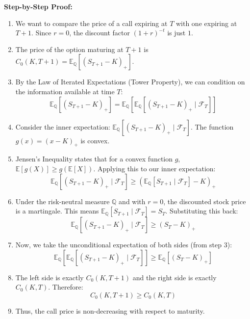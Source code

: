 \textbf{Step-by-Step Proof:}
\begin{enumerate}
    \item We want to compare the price of a call expiring at $T$ with one expiring at $T+1$. Since $r=0$, the discount factor $(1+r)^{-t}$ is just $1$.
    \item The price of the option maturing at $T+1$ is $C_0(K, T+1) = \mathbb{E}_{\mathbb{Q}}[(S_{T+1} - K)_+]$.
    \item By the Law of Iterated Expectations (Tower Property), we can condition on the information available at time $T$:
    \begin{equation}
        \mathbb{E}_{\mathbb{Q}}[(S_{T+1} - K)_+] = \mathbb{E}_{\mathbb{Q}} \left[ \mathbb{E}_{\mathbb{Q}}[(S_{T+1} - K)_+ \mid \mathcal{F}_T] \right]
    \end{equation}
    \item Consider the inner expectation: $\mathbb{E}_{\mathbb{Q}}[(S_{T+1} - K)_+ \mid \mathcal{F}_T]$. The function $g(x) = (x - K)_+$ is convex. 
    \item Jensen's Inequality states that for a convex function $g$, $\mathbb{E}[g(X)] \ge g(\mathbb{E}[X])$. Applying this to our inner expectation:
    \begin{equation}
        \mathbb{E}_{\mathbb{Q}}[(S_{T+1} - K)_+ \mid \mathcal{F}_T] \ge (\mathbb{E}_{\mathbb{Q}}[S_{T+1} \mid \mathcal{F}_T] - K)_+
    \end{equation}
    \item Under the risk-neutral measure $\mathbb{Q}$ and with $r=0$, the discounted stock price is a martingale. This means $\mathbb{E}_{\mathbb{Q}}[S_{T+1} \mid \mathcal{F}_T] = S_T$. Substituting this back:
    \begin{equation}
        \mathbb{E}_{\mathbb{Q}}[(S_{T+1} - K)_+ \mid \mathcal{F}_T] \ge (S_T - K)_+
    \end{equation}
    \item Now, we take the unconditional expectation of both sides (from step 3):
    \begin{equation}
        \mathbb{E}_{\mathbb{Q}} \left[ \mathbb{E}_{\mathbb{Q}}[(S_{T+1} - K)_+ \mid \mathcal{F}_T] \right] \ge \mathbb{E}_{\mathbb{Q}}[(S_T - K)_+]
    \end{equation}
    \item The left side is exactly $C_0(K, T+1)$ and the right side is exactly $C_0(K, T)$. Therefore:
    \begin{equation}
        C_0(K, T+1) \ge C_0(K, T)
    \end{equation}
    \item Thus, the call price is non-decreasing with respect to maturity.
\end{enumerate}